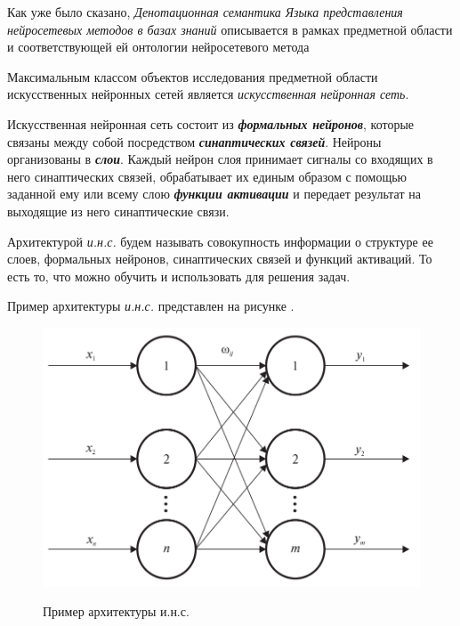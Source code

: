 Как уже было сказано, \textit{Денотационная семантика Языка представления нейросетевых методов в базах знаний} описывается в рамках предметной области и соответствующей ей онтологии нейросетевого метода

Максимальным классом объектов исследования предметной области искусственных нейронных сетей является \textit{искусственная нейронная сеть}.

\begin{SCn}
\end{SCn}

Искусственная нейронная сеть состоит из \textbf{\textit{формальных нейронов}}, которые связаны между собой посредством \textbf{\textit{синаптических связей}}. Нейроны организованы в \textbf{\textit{слои}}. Каждый нейрон слоя принимает сигналы со входящих в него синаптических связей, обрабатывает их единым образом с помощью заданной ему или всему слою \textbf{\textit{функции активации}} и передает результат на выходящие из него синаптические связи.

Архитектурой \textit{и.н.с.} будем называть совокупность информации о структуре ее слоев, формальных нейронов, синаптических связей и функций активаций. То есть то, что можно обучить и использовать для решения задач.

Пример архитектуры \textit{и.н.с.} представлен на рисунке \textit{}.

\begin{figure}[H]
	\centering
	\caption{Пример архитектуры и.н.с.}
	\includegraphics[scale=0.3]{author/part3/figures/neural_network.png}
	\label{fig:nn_example}
\end{figure}

